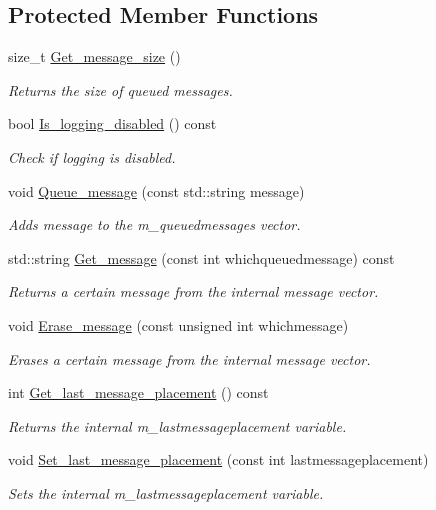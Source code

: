 \subsection*{Protected Member Functions}
\begin{DoxyCompactItemize}
\item 
size\+\_\+t \hyperlink{classjetfuel_1_1core_1_1Message__bus_a784a11d711a1df93b66416c93b9fd494}{Get\+\_\+message\+\_\+size} ()
\begin{DoxyCompactList}\small\item\em Returns the size of queued messages. \end{DoxyCompactList}\item 
bool \hyperlink{classjetfuel_1_1core_1_1Message__bus_ad659ed1f593c8e57ec0308e8bb1f20cb}{Is\+\_\+logging\+\_\+disabled} () const
\begin{DoxyCompactList}\small\item\em Check if logging is disabled. \end{DoxyCompactList}\item 
void \hyperlink{classjetfuel_1_1core_1_1Message__bus_a76c25f2b2e8aa7a9cf523b1965dd9953}{Queue\+\_\+message} (const std\+::string message)
\begin{DoxyCompactList}\small\item\em Adds message to the m\+\_\+queuedmessages vector. \end{DoxyCompactList}\item 
std\+::string \hyperlink{classjetfuel_1_1core_1_1Message__bus_a36316ce1a4ddbd9a36c39f82e81a7f23}{Get\+\_\+message} (const int whichqueuedmessage) const
\begin{DoxyCompactList}\small\item\em Returns a certain message from the internal message vector. \end{DoxyCompactList}\item 
void \hyperlink{classjetfuel_1_1core_1_1Message__bus_abf8cc3024d814c80935c3622a4532f7b}{Erase\+\_\+message} (const unsigned int whichmessage)
\begin{DoxyCompactList}\small\item\em Erases a certain message from the internal message vector. \end{DoxyCompactList}\item 
int \hyperlink{classjetfuel_1_1core_1_1Message__bus_a1703d66bdf3faac3dd7e90edec0962f4}{Get\+\_\+last\+\_\+message\+\_\+placement} () const
\begin{DoxyCompactList}\small\item\em Returns the internal m\+\_\+lastmessageplacement variable. \end{DoxyCompactList}\item 
void \hyperlink{classjetfuel_1_1core_1_1Message__bus_a12c40043878677d0dbb5e9897f48d08f}{Set\+\_\+last\+\_\+message\+\_\+placement} (const int lastmessageplacement)
\begin{DoxyCompactList}\small\item\em Sets the internal m\+\_\+lastmessageplacement variable. \end{DoxyCompactList}\end{DoxyCompactItemize}


